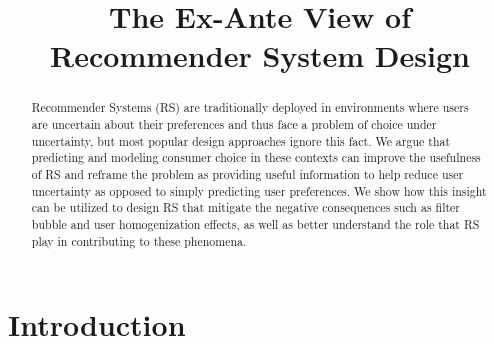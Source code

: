 \documentclass[sigconf]{acmart}
\begin{document}
%
\title{The Ex-Ante View of Recommender System Design}
%

%
\begin{abstract}
Recommender Systems (RS) are traditionally deployed in environments where users are uncertain about their preferences and thus face a problem of choice under uncertainty, but most popular design approaches ignore this fact. We argue that predicting and modeling consumer choice in these contexts can improve the usefulness of RS and reframe the problem as providing useful information to help reduce user uncertainty as opposed to simply predicting user preferences. We show how this insight can be utilized to design RS that mitigate the negative consequences such as filter bubble and user homogenization effects, as well as better understand the role that RS play in contributing to these phenomena.
\end{abstract}

%
%

%

%
\maketitle

\section{Introduction}
\end{document}
